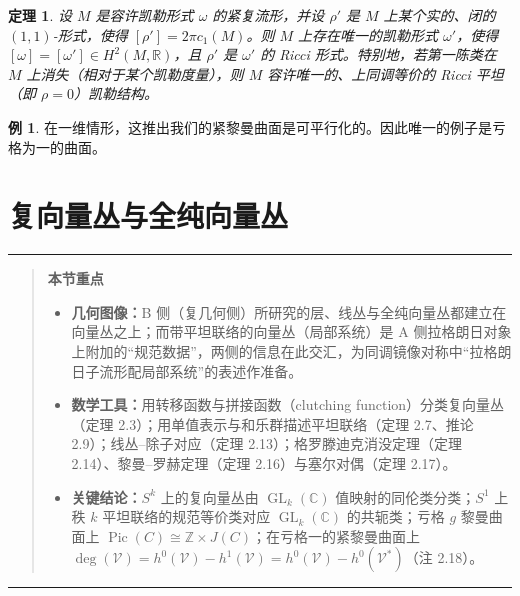 \documentclass[11pt,a4paper]{article}
\theoremstyle{plain}
\newtheorem{theorem}{定理}[section]
\theoremstyle{definition}
\newtheorem*{example}{例}
\newenvironment{keytakeaways}[1][本节重点]{%
  \par\addvspace{9pt}%
  \noindent\rule{\linewidth}{0.7pt}\par\nobreak
  \begin{quote}\noindent\textbf{#1}\par\small
}{%
  \end{quote}%
  \noindent\rule{\linewidth}{0.7pt}\par\addvspace{7pt}%
}
\begin{document}
\begin{theorem}
设 $M$ 是容许凯勒形式 $\omega$ 的紧复流形，并设 $\rho'$ 是 $M$ 上某个实的、闭的 $(1,1)$-形式，使得 $[\rho']=2\pi c_1(M)$。则 $M$ 上存在唯一的凯勒形式 $\omega'$，使得 $[\omega]=[\omega']\in H^2(M,\mathbb{R})$，且 $\rho'$ 是 $\omega'$ 的 Ricci 形式。特别地，若第一陈类在 $M$ 上消失（相对于某个凯勒度量），则 $M$ 容许唯一的、上同调等价的 Ricci 平坦（即 $\rho=0$）凯勒结构。
\end{theorem}


\begin{example}
在一维情形，这推出我们的紧黎曼曲面是可平行化的。因此唯一的例子是亏格为一的曲面。
\end{example}

\section{复向量丛与全纯向量丛}

\begin{keytakeaways}
\begin{itemize}[leftmargin=1.6em,itemsep=1pt,topsep=2pt]
  \item \textbf{几何图像：}B 侧（复几何侧）所研究的层、线丛与全纯向量丛都建立在向量丛之上；而带平坦联络的向量丛（局部系统）是 A 侧拉格朗日对象上附加的“规范数据”，两侧的信息在此交汇，为同调镜像对称中“拉格朗日子流形配局部系统”的表述作准备。
  \item \textbf{数学工具：}用转移函数与拼接函数（clutching function）分类复向量丛（定理 2.3）；用单值表示与和乐群描述平坦联络（定理 2.7、推论 2.9）；线丛–除子对应（定理 2.13）；格罗滕迪克消没定理（定理 2.14）、黎曼–罗赫定理（定理 2.16）与塞尔对偶（定理 2.17）。
  \item \textbf{关键结论：}$S^k$ 上的复向量丛由 $\operatorname{GL}_k(\mathbb{C})$ 值映射的同伦类分类；$S^1$ 上秩 $k$ 平坦联络的规范等价类对应 $\operatorname{GL}_k(\mathbb{C})$ 的共轭类；亏格 $g$ 黎曼曲面上 $\operatorname{Pic}(C)\cong\mathbb{Z}\times J(C)$；在亏格一的紧黎曼曲面上 $\deg(\mathcal{V})=h^0(\mathcal{V})-h^1(\mathcal{V})=h^0(\mathcal{V})-h^0(\mathcal{V}^*)$（注 2.18）。
\end{itemize}
\end{keytakeaways}
\end{document}
